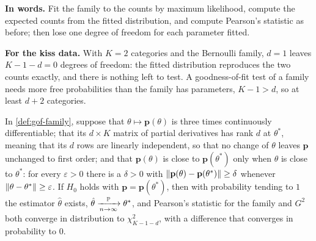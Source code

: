 \begin{inwords}
\textbf{In words.} Fit the family to the counts by maximum likelihood, compute the expected counts from the fitted distribution, and compute Pearson's statistic as before; then lose one degree of freedom for each parameter fitted.
\par\smallskip
\textbf{For the kiss data.} With $K = 2$ categories and the Bernoulli family, $d = 1$ leaves $K - 1 - d = 0$ degrees of freedom: the fitted distribution reproduces the two counts exactly, and there is nothing left to test. A goodness-of-fit test of a family needs more free probabilities than the family has parameters, $K - 1 > d$, so at least $d + 2$ categories.
\end{inwords}


\begin{theorem}
\label{thm:gof-family}
In \cref{def:gof-family}, suppose that $\theta \mapsto \mathbf{p}(\theta)$ is three times continuously differentiable; that its $d \times K$ matrix of partial derivatives has rank $d$ at $\theta^*$, meaning that its $d$ rows are linearly independent, so that no change of $\theta$ leaves $\mathbf{p}$ unchanged to first order; and that $\mathbf{p}(\theta)$ is close to $\mathbf{p}(\theta^*)$ only when $\theta$ is close to $\theta^*$: for every $\varepsilon > 0$ there is a $\delta > 0$ with $\lVert\mathbf{p}(\theta) - \mathbf{p}(\theta^*)\rVert \geq \delta$ whenever $\lVert\theta - \theta^*\rVert \geq \varepsilon$.
If $H_0$ holds with $\mathbf{p} = \mathbf{p}(\theta^*)$, then with probability tending to $1$ the estimator $\hat{\theta}$ exists, $\hat{\theta} \xrightarrow [n \to \infty ]{\mathbb{P}} \theta^*$, and Pearson's statistic for the family and $G^2$ both converge in distribution to $\chi^2_{K-1-d}$, with a difference that converges in probability to $0$.
\end{theorem}


